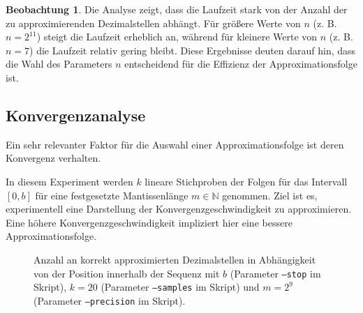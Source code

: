\documentclass{scrartcl}
\theoremstyle{definition}
\newtheorem{approximation sequence}{Annäherungsfolge}
\newtheorem{observation}{Beobachtung}
\begin{document}
\begin{observation}
    Die Analyse zeigt, dass die Laufzeit stark von der Anzahl der zu
    approximierenden Dezimalstellen abhängt. Für größere Werte von \(n\) (z. B.
    \(n = 2^{11}\)) steigt die Laufzeit erheblich an, während für kleinere
    Werte von \(n\) (z. B. \(n = 7\)) die Laufzeit relativ gering bleibt. Diese
    Ergebnisse deuten darauf hin, dass die Wahl des Parameters \(n\)
    entscheidend für die Effizienz der Approximationsfolge ist.
\end{observation}

\subsection{Konvergenzanalyse}

Ein sehr relevanter Faktor für die Auswahl einer Approximationsfolge ist deren
Konvergenz verhalten.

In diesem Experiment werden \(k\) lineare Stichproben der Folgen für das
Intervall \([0, b]\) für eine festgesetzte Mantissenlänge \(m \in \mathbb{N}\)
genommen. Ziel ist es, experimentell eine Darstellung der
Konvergenzgeschwindigkeit zu approximieren. Eine höhere
Konvergenzgeschwindigkeit impliziert hier eine bessere Approximationsfolge.

\begin{figure}[H]
    \centering
    \subfloat[\centering \(b = 10^2\)]{%
        
    }
    \subfloat[\centering \(b = 10^6\)]{%
        
    }
    \caption{%
        Anzahl an korrekt approximierten Dezimalstellen in Abhängigkeit von der
        Position innerhalb der Sequenz mit \(b\) (Parameter \texttt{--stop} im
        Skript), \(k = 20\) (Parameter \texttt{--samples} im Skript) und \(m =
        2^9\) (Parameter \texttt{--precision} im Skript). }
    \label{fig:convergence-analysis}
\end{figure}
\end{document}
